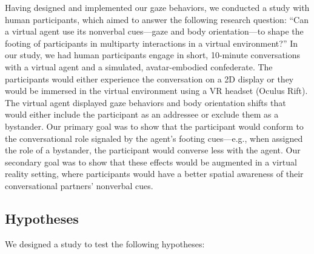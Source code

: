 Having designed and implemented our gaze behaviors, we conducted a study with human participants, which aimed to answer the following research question: ``Can a virtual agent use its nonverbal cues---gaze and body orientation---to shape the footing of participants in multiparty interactions in a virtual environment?'' In our study, we had human participants engage in short, 10-minute conversations with a virtual agent and a simulated, avatar-embodied confederate. The participants would either experience the conversation on a 2D display or they would be immersed in the virtual environment using a VR headset (Oculus Rift). The virtual agent displayed gaze behaviors and body orientation shifts that would either include the participant as an addressee or exclude them as a bystander. Our primary goal was to show that the participant would conform to the conversational role signaled by the agent's footing cues---e.g., when assigned the role of a bystander, the participant would converse less with the agent. Our secondary goal was to show that these effects would be augmented in a virtual reality setting, where participants would have a better spatial awareness of their conversational partners' nonverbal cues.

\subsection{Hypotheses}

We designed a study to test the following hypotheses:

